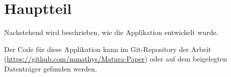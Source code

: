 \chapter{Hauptteil}

Nachstehend wird beschrieben, wie die Applikation entwickelt wurde.

Der Code für diese Applikation kann im Git-Repository der Arbeit (\url{https://github.com/mmathys/Matura-Paper}) oder auf dem beigelegten Datenträger gefunden werden.







% 